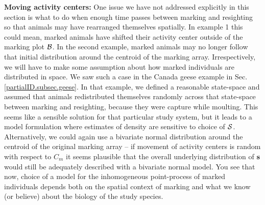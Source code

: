 {\flushleft \bf Moving activity centers:} One issue we have not addressed explicitly in this section is what to do when enough time passes between marking and resighting so that animals may have rearranged themselves spatially. In example 1 this could mean, marked animals have shifted their activity center outside of the marking plot ${\cal B}$. In the second example, marked animals may no longer follow that initial distribution around the centroid of the marking array. Irrespectively, we will have to make some assumption about how marked individuals are distributed in space. We saw such a case in the Canada geese example in Sec. \ref{partialID.subsec.geese}. In that example, we defined a reasonable state-space and assumed that animals redistributed themselves randomly across that state-space between marking and resighting, because they were capture while moulting. This seems like a sensible solution for that particular study system, but it leads to a model formulation where estimates of density are sensitive to choice of ${\cal S}$. Alternatively, we could again use a bivariate normal distribution around the centroid of the original marking array -- if movement of activity centers is random with respect to $C_m$ it seems plausible that the overall underlying distribution of $\bf s$ would still be adequately described with a bivariate normal model.
You see that now, choice of a model for the inhomogeneous point-process of marked individuals depends both on the spatial context of marking and what we know (or believe) about the biology of the study species.

